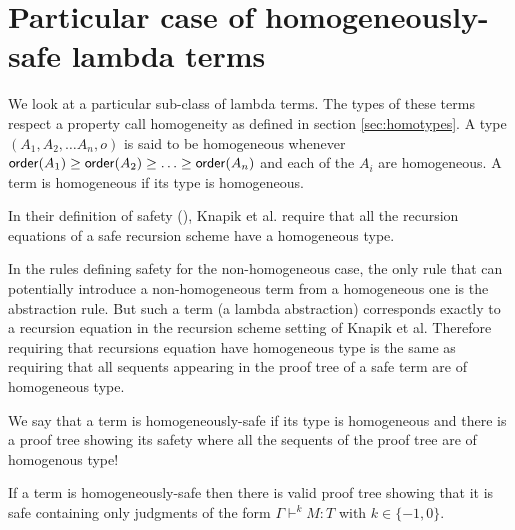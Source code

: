 
\section{Particular case of homogeneously-safe lambda terms}

We look at a particular sub-class of lambda terms. The types of
these terms respect a property call homogeneity as defined in
section \ref{sec:homotypes}. A type $(A_1, A_2, \ldots A_n, o)$ is
said to be homogeneous whenever ${\sf order}(A_1) \geq {\sf order}(A_2) \geq
\ldots \geq  {\sf order}(A_n)$ and each of the $A_i$ are homogeneous. A
term is homogeneous if its type is homogeneous.


In their definition of safety (\cite{KNU02}), Knapik et al. require
that all the recursion equations of a safe recursion scheme have a
homogeneous type.

In the rules defining safety for the non-homogeneous case, the only
rule that can potentially introduce a non-homogeneous term from a
homogeneous one is the abstraction rule. But such a term (a lambda
abstraction) corresponds exactly to a recursion equation in the
recursion scheme setting of Knapik et al. Therefore requiring that
recursions equation have homogeneous type is the same as requiring
that all sequents appearing in the proof tree of a safe term are of
homogeneous type.

We say that a term is homogeneously-safe if its type is homogeneous
and there is a proof tree showing its safety where all the sequents
of the proof tree are of homogenous type!

\begin{lem}
\label{lem:homog_judg_zero_minusone} If a term is homogeneously-safe
then there is valid proof tree showing that it is safe containing
only judgments of the form $\Gamma \vdash^{k} M : T$ with $k\in
\{-1,0\}$.
\end{lem}


